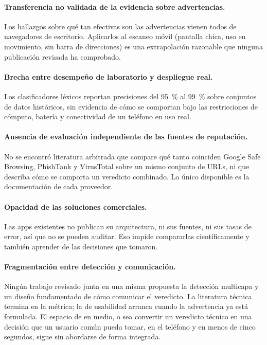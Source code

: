 \paragraph{Transferencia no validada de la evidencia sobre advertencias.}
Los hallazgos sobre qué tan efectivas son las advertencias
\cite{egelman2008warned,akhawe2013alice} vienen todos de navegadores de escritorio.
Aplicarlos al escaneo móvil (pantalla chica, uso en movimiento, sin barra de
direcciones) es una extrapolación razonable que ninguna publicación revisada ha
comprobado.

\paragraph{Brecha entre desempeño de laboratorio y despliegue real.}
Los clasificadores léxicos reportan precisiones del 95~\% al 99~\%
\cite{ma2009beyond,le2011phishdef} sobre conjuntos de datos históricos, sin evidencia de
cómo se comportan bajo las restricciones de cómputo, batería y conectividad de un
teléfono en uso real.

\paragraph{Ausencia de evaluación independiente de las fuentes de reputación.}
No se encontró literatura arbitrada que compare qué tanto coinciden Google Safe
Browsing, PhishTank y VirusTotal sobre un mismo conjunto de URLs, ni que describa cómo se
comporta un veredicto combinado. Lo único disponible es la documentación de cada
proveedor.

\paragraph{Opacidad de las soluciones comerciales.}
Las apps existentes no publican su arquitectura, ni sus fuentes, ni sus tasas de
error, así que no se pueden auditar. Eso impide compararlas científicamente y también
aprender de las decisiones que tomaron.

\paragraph{Fragmentación entre detección y comunicación.}
Ningún trabajo revisado junta en una misma propuesta la detección multicapa y un
diseño fundamentado de cómo comunicar el veredicto. La literatura técnica termina en la
métrica; la de usabilidad arranca cuando la advertencia ya está formulada. El espacio de
en medio, o sea convertir un veredicto técnico en una decisión que un usuario común pueda
tomar, en el teléfono y en menos de cinco segundos, sigue sin abordarse de forma
integrada.


